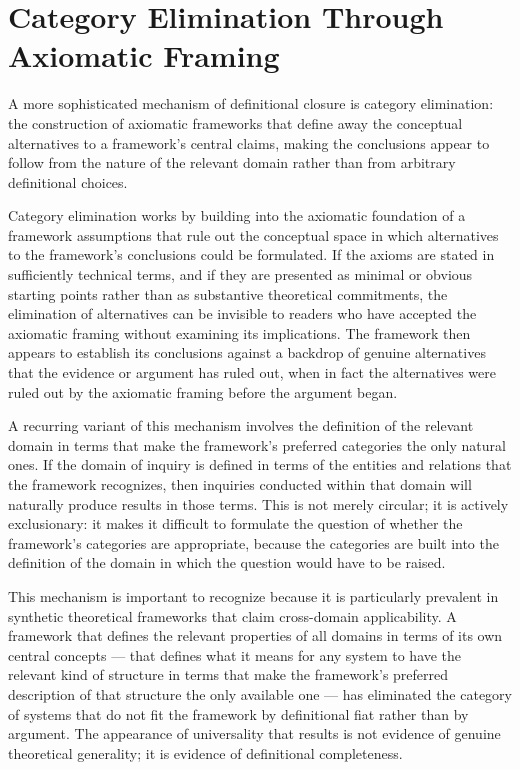 \documentclass[12pt, openright, twoside]{book}
\begin{document}
\section{Category Elimination Through Axiomatic Framing}

A more sophisticated mechanism of definitional closure is
category elimination: the construction of axiomatic frameworks
that define away the conceptual alternatives to a framework's
central claims, making the conclusions appear to follow from
the nature of the relevant domain rather than from arbitrary
definitional choices.

Category elimination works by building into the axiomatic
foundation of a framework assumptions that rule out the
conceptual space in which alternatives to the framework's
conclusions could be formulated. If the axioms are stated
in sufficiently technical terms, and if they are presented
as minimal or obvious starting points rather than as
substantive theoretical commitments, the elimination of
alternatives can be invisible to readers who have accepted
the axiomatic framing without examining its implications.
The framework then appears to establish its conclusions
against a backdrop of genuine alternatives that the evidence
or argument has ruled out, when in fact the alternatives
were ruled out by the axiomatic framing before the argument began.

A recurring variant of this mechanism involves the definition
of the relevant domain in terms that make the framework's
preferred categories the only natural ones. If the domain
of inquiry is defined in terms of the entities and relations
that the framework recognizes, then inquiries conducted
within that domain will naturally produce results in those
terms. This is not merely circular; it is actively exclusionary:
it makes it difficult to formulate the question of whether
the framework's categories are appropriate, because the
categories are built into the definition of the domain
in which the question would have to be raised.

This mechanism is important to recognize because it is
particularly prevalent in synthetic theoretical frameworks
that claim cross-domain applicability. A framework that
defines the relevant properties of all domains in terms of
its own central concepts --- that defines what it means for
any system to have the relevant kind of structure in terms
that make the framework's preferred description of that
structure the only available one --- has eliminated the
category of systems that do not fit the framework by
definitional fiat rather than by argument. The appearance
of universality that results is not evidence of genuine
theoretical generality; it is evidence of definitional
completeness.
\end{document}
